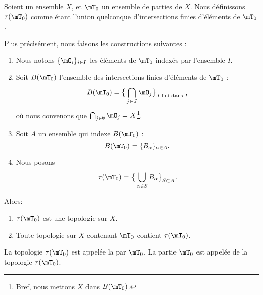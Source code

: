 \begin{propositionDef}\label{DefTopologieEngendree}
	Soient un ensemble \( X \), et \( \mT_0 \) un ensemble de parties de \( X \). Nous définissons \( \tau(\mT_0)\) comme étant l'union quelconque d'intersections finies d'éléments de \( \mT_0 \).

	Plus précisément, nous faisons les constructions suivantes :
	\begin{enumerate}
		\item
		      Nous notons \( \{\mO_i \}_{i\in I}\) les éléments de \( \mT_0\) indexés par l'ensemble \( I\).
		\item
		      Soit  \( B(\mT_0)\) l'ensemble des intersections finies d'éléments de \( \mT_0\) :
		      \begin{equation}
			      B(\mT_0)=\big\{ \bigcap_{j\in J}\mO_j \big\}_{J\text{ fini dans }I}
		      \end{equation}
		      où nous convenons que \( \bigcap_{j\in\emptyset}\mO_j=X\)\footnote{Bref, nous mettons \( X\) dans \( B(\mT_0)\).}.
		\item
		      Soit \( A\) un ensemble qui indexe \(   B(\mT_0) \) :
		      \begin{equation}
			      B(\mT_0)=\{ B_{\alpha} \}_{\alpha\in A}.
		      \end{equation}
		\item
		      Nous posons
		      \begin{equation}
			      \tau(\mT_0)=\big\{    \bigcup_{\alpha\in S}B_{\alpha}   \big\}_{S\subset A}.
		      \end{equation}
	\end{enumerate}
	Alors:
	\begin{enumerate}
		\item       \label{ITEMooTCGTooJwfpel}
		      \( \tau(\mT_0) \) est une topologie sur \(X\).
		\item       \label{ITEMooBJVVooEVRgdq}
		      Toute topologie sur \( X\) contenant \( \mT_0\) contient \( \tau(\mT_0)\).
	\end{enumerate}
	La topologie \( \tau(\mT_0)\) est appelée la  par \( \mT_0 \). La partie \( \mT_0\) est appelée  de la topologie \(  \tau(\mT_0)  \).
\end{propositionDef}

